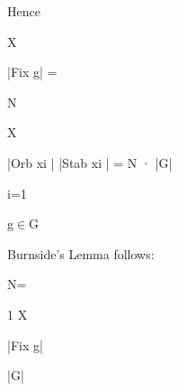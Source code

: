 \documentclass[a4paper,portrait,12pt]{article}
\begin{document}
\begin{flushleft}
Hence
\end{flushleft}


\begin{flushleft}
X
\end{flushleft}





\begin{flushleft}
|Fix g| =
\end{flushleft}





\begin{flushleft}
N
\end{flushleft}


\begin{flushleft}
X
\end{flushleft}





\begin{flushleft}
|Orb xi | |Stab xi | = N · |G|
\end{flushleft}





\begin{flushleft}
i=1
\end{flushleft}





\begin{flushleft}
g$\in$G
\end{flushleft}





\begin{flushleft}
Burnside's Lemma follows:
\end{flushleft}


\begin{flushleft}
N=
\end{flushleft}





\begin{flushleft}
1 X
\end{flushleft}


\begin{flushleft}
|Fix g|
\end{flushleft}


\begin{flushleft}
|G|
\end{flushleft}
\end{document}
